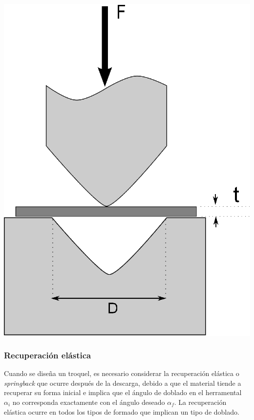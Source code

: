 \begin{center}
\includegraphics[scale=0.4]{src/ch2/fuerza_doblado.eps}
\label{fig:fuerza_doblado}
\end{center}


\subsubsection{Recuperación elástica}

Cuando se diseña un troquel, es necesario considerar la recuperación elástica o \textit{springback} 
que ocurre después de la descarga, debido a que el material tiende a recuperar su forma 
inicial e implica que el ángulo de doblado en el herramental $\alpha_i$ no corresponda exactamente con el 
ángulo deseado $\alpha_f$. La recuperación elástica ocurre en todos los tipos de formado 
que implican un tipo de doblado.\\

